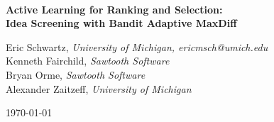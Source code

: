 \documentclass[a4paper,11pt]{article}
\newcommand{\titleofthispaper}{
	\textbf{Active Learning for Ranking and Selection: \\
	Idea Screening with Bandit Adaptive MaxDiff} 
}
\begin{document}

\begin{center}

	~ \\

	\vspace{2in}

	\titleofthispaper

	\vspace{1in}

	{Eric Schwartz,}
	\emph{University of Michigan, {ericmsch@umich.edu} } \\
	{Kenneth Fairchild,} 
	\emph{Sawtooth Software} \\
	{Bryan Orme,}
	\emph{Sawtooth Software} \\
	{Alexander Zaitzeff,}
	\emph{University of Michigan} 

	\vspace{1in}

	\today


\end{center}
\newpage






\end{document}
